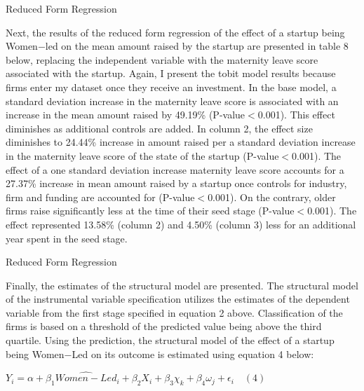 \begin{table}[H]
 \captionsetup{justification=raggedright,singlelinecheck=false}
    \caption{Reduced Form Regression}
        
\end{table}

Next, the results of the reduced form regression of the effect of a startup being Women−led on the mean amount raised by the startup are presented in table 8 below, replacing the independent variable with the maternity leave score associated with the startup. Again, I present the tobit model results because firms enter my dataset once they receive an investment. In the base model, a standard deviation increase in the maternity leave score is associated with an increase in the mean amount raised by 49.19\% (P-value$<$0.001). This effect diminishes as additional controls are added. In column 2, the effect size diminishes to 24.44\% increase in amount raised per a standard deviation increase in the maternity leave score of the state of the startup (P-value$<$0.001). The effect of a one standard deviation increase maternity leave score accounts for a 27.37\% increase in mean amount raised by a startup once controls for industry, firm and funding are accounted for (P-value$<$0.001). On the contrary, older firms raise significantly less at the time of their seed stage (P-value$<$0.001). The effect represented 13.58\% (column 2) and 4.50\% (column 3) less for an additional year spent in the seed stage. 

\begin{table}[H]
\captionsetup{justification=raggedright,singlelinecheck=false}
 \caption{Reduced Form Regression}
        
\end{table}

Finally, the estimates of the structural model are presented. The structural model of the instrumental variable specification utilizes the estimates of the dependent variable from the first stage specified in equation 2 above. Classification of the firms is based on a threshold of the predicted value being above the third quartile. Using the prediction, the structural model of the effect of a startup being Women−Led on its outcome is estimated using equation 4 below:

\begin{center}
$Y_{i}=\alpha +\beta_1\widehat{Women-Led}_i+\beta_2X_{i} + \beta_{3}\chi_{k} + \beta_4\omega_{j}  + \epsilon_{i} \quad (4) $
\end{center}

